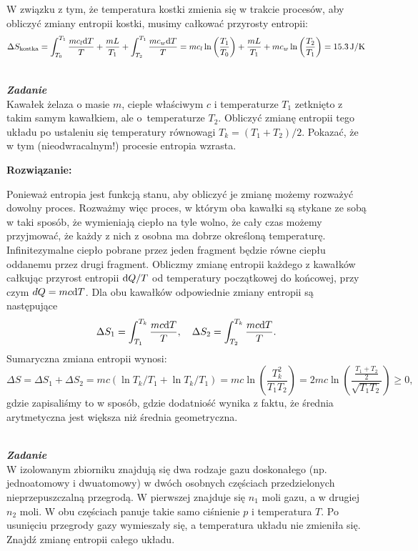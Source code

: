 \documentclass[11pt,a4paper]{article}
\renewcommand{\t}[1]{\textrm{#1}}
\renewcommand{\u}[1]{\,\textrm{#1}}
\newcommand{\dd}{{{\rm d}}}
\newcounter{zadanie}\newcommand{\zadanie}[1][]{\addtocounter{zadanie}{1} ~\\  {\bf \emph{Zadanie \arabic{zadanie} #1 }} \\}
\renewcommand{\t}[1]{\textrm{#1}}
\begin{document}
W związku z tym, że temperatura kostki zmienia się w trakcie procesów, aby  obliczyć zmiany entropii kostki, musimy całkować przyrosty entropii:
\begin{equation}
\Delta S_{\t{kostka}} =  \int_{T_0}^{T_1} \frac{m c_l \dd T}{T} + \frac{m L}{T_1} + \int_{T_2}^{T_1} \frac{m c_w \dd T}{T}
=m c_l \ln \left(\frac{T_1}{T_0} \right) + \frac{m L}{T_1} + m c_w \ln \left(\frac{T_2}{T_1}\right) = 15.3 \u{J/K}
\end{equation}

\newpage
\zadanie
Kawałek żelaza o masie $m$, cieple właściwym $c$ i temperaturze $T_1$ zetknięto
z takim samym kawałkiem, ale o~temperaturze $T_2$.
Obliczyć zmianę entropii tego układu po ustaleniu się temperatury
równowagi \mbox{$T_k = (T_1+T_2)/2$}. Pokazać, że w tym (nieodwracalnym!)
procesie entropia wzrasta.

\vskip 10pt
\noindent
\textbf{Rozwiązanie:}

Ponieważ entropia jest funkcją stanu, aby obliczyć je zmianę możemy  rozważyć dowolny proces. Rozważmy więc proces, w którym oba kawałki są stykane ze sobą w taki sposób, że wymieniają ciepło na tyle wolno, że cały czas możemy przyjmować, że każdy z nich z osobna ma dobrze określoną temperaturę. Infinitezymalne ciepło pobrane przez jeden fragment będzie równe ciepłu oddanemu przez drugi fragment. Obliczmy zmianę entropii każdego z kawałków całkując przyrost entropii $\dd Q/T$ od temperatury początkowej do końcowej, przy czym
$dQ = m c \dd T$. Dla obu kawałków odpowiednie zmiany entropii są następujące
\begin{equation}
\Delta S_1 = \int_{T_1}^{T_k} \frac{m c \dd T}{T}, \quad \Delta S_2 = \int_{T_2}^{T_k} \frac{m c \dd T}{T}.
\end{equation}
Sumaryczna zmiana entropii wynosi:
\begin{equation}
\Delta S = \Delta S_1+\Delta S_2 = m c \left( \ln T_k/T_1  + \ln T_k/T_1   \right) = m c \ln \left(\frac{T_k^2}{T_1 T_2}\right) =
2 m c \ln \left(\frac{\frac{T_1 + T_2}{2}}{\sqrt{T_1 T_2}}\right) \geq 0,
\end{equation}
gdzie zapisaliśmy to w sposób, gdzie dodatniość wynika z faktu, że średnia arytmetyczna jest większa niż średnia geometryczna.


\newpage
\zadanie
W izolowanym zbiorniku znajdują się dwa rodzaje gazu doskonałego (np. jednoatomowy i dwuatomowy)
w dwóch osobnych częściach przedzielonych nieprzepuszczalną przegrodą.
W pierwszej znajduje się $n_1$ moli gazu, a w drugiej $n_2$ moli.
W obu częściach panuje takie samo ciśnienie $p$ i temperatura $T$.
Po usunięciu przegrody gazy wymieszały się, a temperatura układu nie zmieniła się.
Znajdź zmianę entropii całego układu.
\newline
\end{document}
